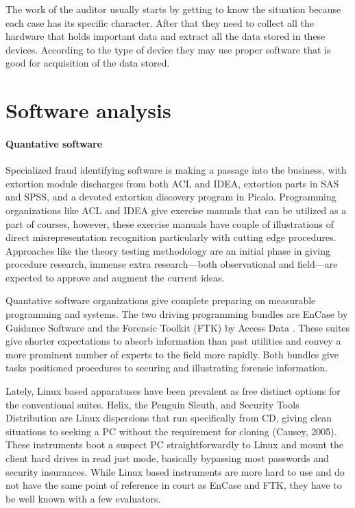 The work of the auditor usually starts by getting to know the situation because each case has its specific character. After that they need to collect all the hardware that holds important data and extract all the data stored in these devices. According to the type of device they may use proper software that is good for acquisition of the data stored.



\section{Software analysis}
\paragraph{Quantative software}\label{qSW}

Specialized fraud identifying software is making a passage into the business, with extortion module discharges from both ACL and IDEA\textsuperscript{\textregistered}, extortion parts in SAS and SPSS, and a devoted extortion discovery program in Picalo. Programming organizations like ACL and IDEA\textsuperscript{\textregistered} give exercise manuals that can be utilized as a part of courses, however, these exercise manuals have couple of illustrations of direct misrepresentation recognition particularly with cutting edge procedures. Approaches like the theory testing methodology are an initial phase in giving procedure research, immense extra research—both observational and field—are expected to approve and augment the current ideas.

Quantative software organizations give complete preparing on measurable programming and systems. The two driving programming bundles are EnCase by Guidance Software and the Forensic Toolkit (FTK) by Access Data . These suites give shorter expectations to absorb information than past utilities and convey a more prominent number of experts to the field more rapidly. Both bundles give tasks positioned procedures to securing and illustrating forensic information.


Lately, Linux based apparatuses have been prevalent as free distinct options for the conventional suites. Helix, the Penguin Sleuth, and Security Tools Distribution are Linux dispersions that run specifically from CD, giving clean situations to seeking a PC without the requirement for cloning (Causey, 2005). These instruments boot a suspect PC straightforwardly to Linux and mount the client hard drives in read just mode, basically bypassing most passwords and security insurances. While Linux based instruments are more hard to use and do not have the same point of reference in court as EnCase and FTK, they have to be well known with a few evaluators.


